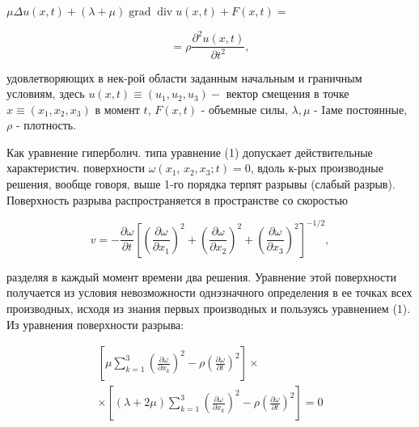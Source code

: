 \documentclass[10pt]{article}
\begin{document}
$\mu \Delta u(x, t)+(\lambda+\mu) \operatorname{grad} \operatorname{div} u(x, t)+F(x, t)=$



\[

=\rho \frac{\partial^{2} u(x, t)}{\partial t^{2}},

\]



удовлетворяющих в нек-рой области заданным начальным и граничным условиям, здесь $u(x, t) \equiv\left(u_{1}, u_{2}, u_{3}\right)-$ вектор смещения в точке $x \equiv\left(x_{1}, x_{2}, x_{3}\right)$ в момент $t$, $F(x, t)$ - объемные силы, $\lambda, \mu$ - Iаме постоянные, $\rho$ - плотность.



Как уравнение гиперболич. типа уравнение (1) допускает действительные характеристич. поверхности $\omega\left(x_{1}\right.$, $\left.x_{2}, x_{3} ; t\right)=0$, вдоль к-рых производные решения, вообще говоря, выше 1-го порядка терпят разрывы (слабый разрыв). Поверхность разрыва распространяется в пространстве со скоростью



\[

v=-\frac{\partial \omega}{\partial t}\left[\left(\frac{\partial \omega}{\partial x_{1}}\right)^{2}+\left(\frac{\partial \omega}{\partial x_{2}}\right)^{2}+\left(\frac{\partial \omega}{\partial x_{3}}\right)^{2}\right]^{-1 / 2},

\]



разделяя в каждый момент времени два решения. Уравнение этой поверхности получается из условия невозможности однэзначного определения в ее точках всех производных, исходя из знания первых производных и пользуясь уравнением (1). Из уравнения поверхности разрыва:



\[

\begin{gathered}

{\left[\mu \sum_{k=1}^{3}\left(\frac{\partial \omega}{\partial x_{k}}\right)^{2}-\rho\left(\frac{\partial \omega}{\partial t}\right)^{2}\right] \times} \\

\times\left[(\lambda+2 \mu) \sum_{k=1}^{3}\left(\frac{\partial \omega}{\partial x_{k}}\right)^{2}-\rho\left(\frac{\partial \omega}{\partial t}\right)^{2}\right]=0

\end{gathered}

\]
\end{document}
